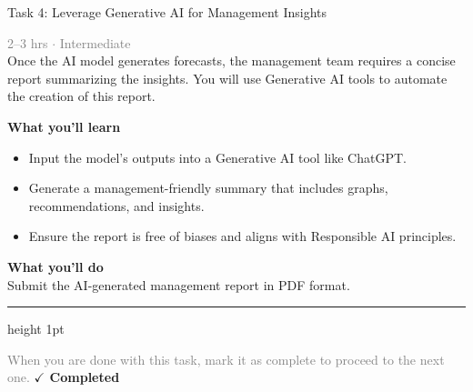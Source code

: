 \documentclass[10pt,a4paper]{article}
\begin{document}
\begin{taskbox}{Task 4: Leverage Generative AI for Management Insights}

    {\small \textcolor{gray}{2--3 hrs $\cdot$ Intermediate}}\\[12pt]

      
Once the AI model generates forecasts, the management team requires a concise report summarizing the insights. You will use Generative AI tools to automate the creation of this report.  


\vspace{8pt}
{\large \textbf{\textcolor{brandLight}{What you'll learn}}}\\[4pt]  
\begin{itemize}
    \item Input the model’s outputs into a Generative AI tool like ChatGPT.  
    \item Generate a management-friendly summary that includes graphs, recommendations, and insights.  
    \item Ensure the report is free of biases and aligns with Responsible AI principles.  
\end{itemize}

\vspace{8pt}
{\large \textbf{\textcolor{brandLight}{What you'll do}}}\\[4pt]  
Submit the AI-generated management report in PDF format.\par

    \vspace{16pt}

    \textcolor{cardBorder}{\hrule height 1pt}\vspace{8pt}

    \small \textcolor{gray}{When you are done with this task, mark it as complete to proceed to the next one.} \hfill \textbf{\textcolor{brandDark}{$\checkmark$ Completed}}

\end{taskbox}
\end{document}
